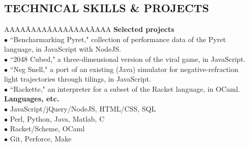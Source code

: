 \documentclass{res}
\begin{document}
\begin{resume}
\section{TECHNICAL SKILLS \& PROJECTS}
\myvspace
\begin{tabbing}
   AAAA\=AAAA\=AAAA\=AAAA\=AAAA\kill
{\bf Selected projects}\\
	\>$\bullet$ ``Bencharmarking Pyret," collection of performance data of the Pyret\\
	\>\phantom{$\bullet$}language, in JavaScript with NodeJS.\\
	\>$\bullet$ ``2048 Cubed," a three-dimensional version of the viral game, in JavaScript.\\
	\>$\bullet$ ``Neg Snell," a port of an existing (Java) simulator for negative-refraction\\
		\>\phantom{$\bullet$} light trajectories through tilings, in JavaScript.\\
	\>$\bullet$ ``Rackette," an interpreter for a subset of the Racket language, in OCaml.\\
\sbreak
{\bf Languages, etc.}\\
  \>$\bullet$ JavaScript/jQuery/NodeJS, HTML/CSS, SQL\\
  \>$\bullet$ Perl, Python, Java, Matlab, C\\
  \>$\bullet$ Racket/Scheme, OCaml\\
  \>$\bullet$ Git, Perforce, Make\\
\end{tabbing}

\end{resume}
\end{document}
